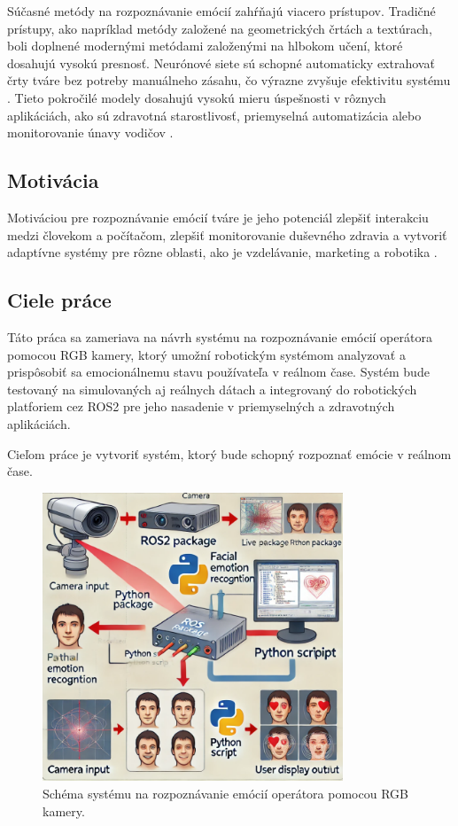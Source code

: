 Súčasné metódy na rozpoznávanie emócií zahŕňajú viacero prístupov. Tradičné prístupy, ako napríklad metódy založené na geometrických črtách a textúrach, boli doplnené modernými metódami založenými 
na hlbokom učení, ktoré dosahujú vysokú presnosť. Neurónové siete sú schopné automaticky extrahovať črty tváre bez potreby manuálneho zásahu, čo výrazne zvyšuje efektivitu systému​. Tieto pokročilé 
modely dosahujú vysokú mieru úspešnosti v rôznych aplikáciách, ako sú zdravotná starostlivosť, priemyselná automatizácia alebo monitorovanie únavy vodičov​ \cite{article03} \cite{book01}.

\subsection{Motivácia}
Motiváciou pre rozpoznávanie emócií tváre je jeho potenciál zlepšiť interakciu medzi človekom a počítačom, zlepšiť monitorovanie duševného zdravia a vytvoriť adaptívne systémy pre rôzne oblasti, 
ako je vzdelávanie, marketing a robotika \cite{article01}.
\subsection{Ciele práce}
Táto práca sa zameriava na návrh systému na rozpoznávanie emócií operátora pomocou RGB kamery, ktorý umožní robotickým systémom analyzovať a prispôsobiť sa emocionálnemu stavu používateľa v reálnom čase. 
Systém bude testovaný na simulovaných aj reálnych dátach a integrovaný do robotických platforiem cez ROS2 pre jeho nasadenie v priemyselných a zdravotných aplikáciách.

Cieľom práce je vytvoriť systém, ktorý bude schopný rozpoznať emócie v reálnom čase.
\begin{figure}[!htpb]
    \centering
    \includegraphics[width=0.8\textwidth]{img/connection.png}
    \caption{Schéma systému na rozpoznávanie emócií operátora pomocou RGB kamery.} 
    \label{fig:schema}
\end{figure}
